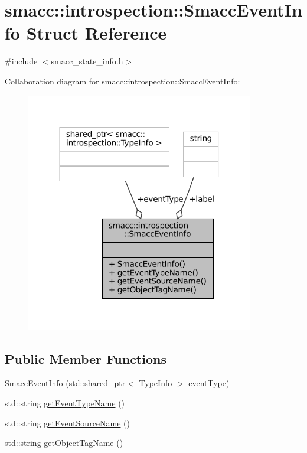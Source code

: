 \hypertarget{structsmacc_1_1introspection_1_1SmaccEventInfo}{}\section{smacc\+:\+:introspection\+:\+:Smacc\+Event\+Info Struct Reference}
\label{structsmacc_1_1introspection_1_1SmaccEventInfo}


{\ttfamily \#include $<$smacc\+\_\+state\+\_\+info.\+h$>$}



Collaboration diagram for smacc\+:\+:introspection\+:\+:Smacc\+Event\+Info\+:
\nopagebreak
\begin{figure}[H]
\begin{center}
\leavevmode
\includegraphics[width=282pt]{structsmacc_1_1introspection_1_1SmaccEventInfo__coll__graph}
\end{center}
\end{figure}
\subsection*{Public Member Functions}
\begin{DoxyCompactItemize}
\item 
\hyperlink{structsmacc_1_1introspection_1_1SmaccEventInfo_a322035851e387c9cb58bc1cfe4c68544}{Smacc\+Event\+Info} (std\+::shared\+\_\+ptr$<$ \hyperlink{classsmacc_1_1introspection_1_1TypeInfo}{Type\+Info} $>$ \hyperlink{structsmacc_1_1introspection_1_1SmaccEventInfo_af3bdf1abf797864e681662d92a5515f9}{event\+Type})
\item 
std\+::string \hyperlink{structsmacc_1_1introspection_1_1SmaccEventInfo_ae0ed6a9506dbe526269a0bd956a71044}{get\+Event\+Type\+Name} ()
\item 
std\+::string \hyperlink{structsmacc_1_1introspection_1_1SmaccEventInfo_af9e90a557f8f62069a17234f79bcefa0}{get\+Event\+Source\+Name} ()
\item 
std\+::string \hyperlink{structsmacc_1_1introspection_1_1SmaccEventInfo_a0aa5d15822e7642079f375ee0f4ff096}{get\+Object\+Tag\+Name} ()
\end{DoxyCompactItemize}
